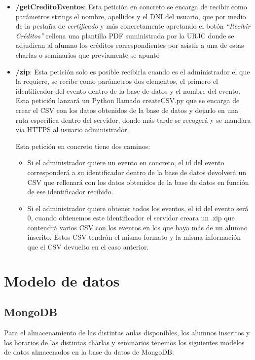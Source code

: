 \documentclass[a4paper, 12pt]{book}
\begin{document}
\begin{itemize}
	\item \textbf{/getCreditoEventos}: Esta petición en concreto se encarga de recibir como parámetros strings el nombre, apellidos y el DNI del usuario, que por medio de la pestaña de \textit{certificado} y más concretamente apretando el botón \textit{``Recibir Créditos''} rellena una plantilla PDF suministrada por la URJC donde se adjudican al alumno los créditos correspondientes por asistir a una de estas charlas o seminarios que previamente se apuntó
	

	\item \textbf{/zip}: Esta petición solo es posible recibirla cuando es el administrador el que la requiere, se recibe como parámetros dos elementos, el primero el identificador del evento dentro de la base de datos y el nombre del evento. Esta petición lanzará un Python llamado createCSV.py que se encarga de crear el CSV con los datos obtenidos de la base de datos y dejarlo en una ruta específica dentro del servidor, donde más tarde se recogerá y se mandara vía HTTPS al usuario administrador.

Esta petición en concreto tiene dos caminos:
\begin{itemize}
	\item  Si el administrador quiere un evento en concreto, el id del evento corresponderá a su identificador dentro de la base de datos devolverá un CSV que rellenará con los datos obtenidos de la base de datos en función de ese identificador recibido. 
	\item Si el administrador quiere obtener todos los eventos, el id del evento será 0, cuando obtenemos este identificador el servidor creara un .zip que contendrá varios CSV con los eventos en los que haya más de un alumno inscrito. Estos CSV tendrán el mismo formato y la misma información que el CSV devuelto en el caso anterior.
\end{itemize}
\end{itemize}

\clearpage

\section{Modelo de datos} 
\label{sec:modelo de datos}

\subsection{MongoDB}
	Para el almacenamiento de las distintas aulas disponibles, los alumnos inscritos y los horarios de las distintas charlas y seminarios tenemos los siguientes modelos de datos almacenados en la base da datos de MongoDB:
	
\end{document}
